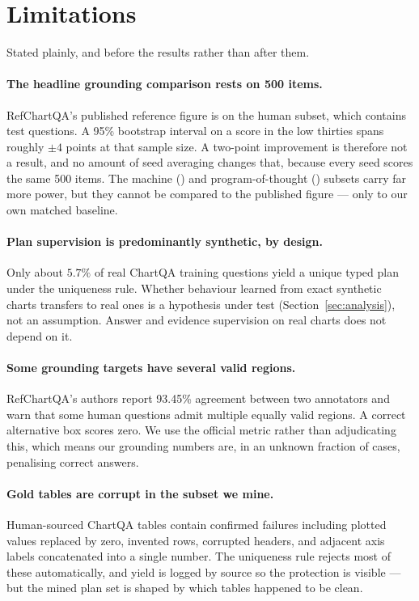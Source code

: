 \section{Limitations}
\label{sec:limitations}

Stated plainly, and before the results rather than after them.

\paragraph{The headline grounding comparison rests on 500 items.}
RefChartQA's published reference figure is on the human subset, which contains  test
questions. A 95\% bootstrap interval on a score in the low thirties spans roughly $\pm4$ points at
that sample size. A two-point improvement is therefore not a result, and no amount of seed averaging
changes that, because every seed scores the same 500 items. The machine () and
program-of-thought () subsets carry far more power, but they cannot be compared to
the published figure --- only to our own matched baseline.

\paragraph{Plan supervision is predominantly synthetic, by design.}
Only about $5.7\%$ of real ChartQA training questions yield a unique typed plan under the uniqueness
rule. Whether behaviour learned from exact synthetic charts transfers to real ones is a hypothesis
under test (Section~\ref{sec:analysis}), not an assumption. Answer and evidence supervision on real
charts does not depend on it.

\paragraph{Some grounding targets have several valid regions.}
RefChartQA's authors report 93.45\% agreement between two annotators and warn that some human
questions admit multiple equally valid regions. A correct alternative box scores zero. We use the
official metric rather than adjudicating this, which means our grounding numbers are, in an unknown
fraction of cases, penalising correct answers.

\paragraph{Gold tables are corrupt in the subset we mine.}
Human-sourced ChartQA tables contain confirmed failures including plotted values replaced by zero,
invented rows, corrupted headers, and adjacent axis labels concatenated into a single number. The
uniqueness rule rejects most of these automatically, and yield is logged by source so the protection
is visible --- but the mined plan set is shaped by which tables happened to be clean.

